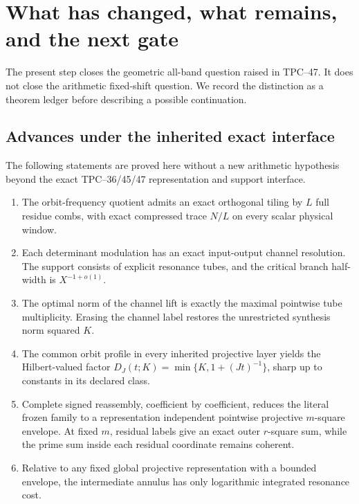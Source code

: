 \section{What has changed, what remains, and the next gate}
\label{sec:tpc48-boundaries}

The present step closes the geometric all-band question raised in
TPC--47.  It does not close the arithmetic fixed-shift question.  We
record the distinction as a theorem ledger before describing a
possible continuation.

\subsection{Advances under the inherited exact interface}

The following statements are proved here without a new arithmetic
hypothesis beyond the exact TPC--36/45/47 representation and support
interface.
\begin{enumerate}[label=\textup{(\roman*)},leftmargin=2.4em]
 \item The orbit-frequency quotient admits an exact orthogonal tiling
       by \(L\) full residue combs, with exact compressed trace \(N/L\)
       on every scalar physical window.
 \item Each determinant modulation has an exact input-output channel
       resolution.  The support consists of explicit resonance tubes,
       and the critical branch half-width is \(X^{-1+o(1)}\).
 \item The optimal norm of the channel lift is exactly the maximal
       pointwise tube multiplicity.  Erasing the channel label restores
       the unrestricted synthesis norm squared \(K\).
 \item The common orbit profile in every inherited projective layer
       yields the Hilbert-valued factor
       \(D_J(t;K)=\min\{K,1+(Jt)^{-1}\}\), sharp up to constants in its
       declared class.
 \item Complete signed reassembly, coefficient by coefficient, reduces
       the literal frozen family to a representation independent
       pointwise
       projective \(m\)-square envelope.  At fixed \(m\), residual
       labels give an exact outer \(r\)-square sum, while the prime sum
       inside each residual coordinate remains coherent.
 \item Relative to any fixed global projective representation with a
       bounded envelope, the intermediate annulus has only logarithmic
       integrated resonance cost.
\end{enumerate}

